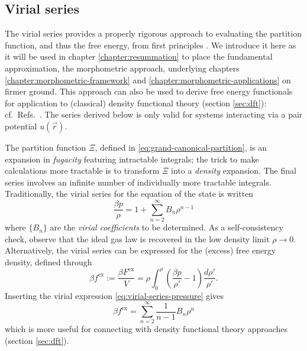 \subsection{Virial series}
\label{sec:virial-series}

The virial series provides a properly rigorous approach to evaluating the partition function, and thus the free energy, from first principles \cite{UrsellMPCPS1927,MayerJCP1941,MontrollJCP1941,Hansen2013,Santos2016}.
We introduce it here as it will be used in chapter \ref{chapter:resummation} to place the fundamental approximation, the morphometric approach, underlying chapters \ref{chapter:morphometric-framework} and \ref{chapter:morphometric-applications} on firmer ground.
This approach can also be used to derive free energy functionals for application to (classical) density functional theory (section \ref{sec:dft}): cf.\ Refs.\ \cite{LeithallPRE2011,KordenPRE2012,MarechalPRE2014}.
The series derived below is only valid for systems interacting via a pair potential $u(\vec{r})$.

The partition function $\Xi$, defined in \eqref{eq:grand-canonical-partition}, is an expansion in \emph{fugacity} featuring intractable integrals; the trick to make calculations more tractable is to transform $\Xi$ into a \emph{density} expansion.
The final series involves an infinite number of individually more tractable integrals.
Traditionally, the virial series for the equation of the state is written
\begin{equation}\label{eq:virial-series-pressure}
  \frac{\beta p}{\rho}
  =
  1 + \sum_{n=2}^\infty B_n \rho^{n-1}
\end{equation}
where $\{B_n\}$ are the \emph{virial coefficients} to be determined.
As a self-consistency check, observe that the ideal gas law is recovered in the low density limit $\rho \to 0$.
Alternatively, the virial series can be expressed for the (excess) free energy density, defined through
\begin{equation}\label{eq:free-energy-density}
  \beta f^\mathrm{ex}
  :=
  \frac{\beta F^\mathrm{ex}}{V}
  =
  \rho \int_0^\rho \left( \frac{\beta p}{\rho'} - 1 \right)
  \frac{d\rho'}{\rho'}.
\end{equation}
Inserting the virial expression \eqref{eq:virial-series-pressure} gives
\begin{equation}\label{eq:virial-series-excess-free-energy}
  \beta f^\mathrm{ex}
  =
  \sum_{n=2}^\infty
  \frac{1}{n-1}
  B_n
  \rho^n
\end{equation}
which is more useful for connecting with density functional theory approaches (section \ref{sec:dft}).

